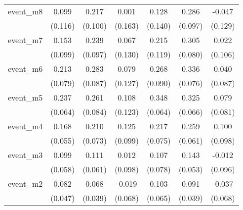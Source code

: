 {\begin{tabular}{l*{6}{c}}
event\_m8    &       0.099         &       0.217\sym{*}  &       0.001         &       0.128         &       0.286\sym{**} &      -0.047         \\
            &     (0.116)         &     (0.100)         &     (0.163)         &     (0.140)         &     (0.097)         &     (0.129)         \\
[1em]
event\_m7    &       0.153         &       0.239\sym{*}  &       0.067         &       0.215         &       0.305\sym{***}&       0.022         \\
            &     (0.099)         &     (0.097)         &     (0.130)         &     (0.119)         &     (0.080)         &     (0.106)         \\
[1em]
event\_m6    &       0.213\sym{**} &       0.283\sym{**} &       0.079         &       0.268\sym{**} &       0.336\sym{***}&       0.040         \\
            &     (0.079)         &     (0.087)         &     (0.127)         &     (0.090)         &     (0.076)         &     (0.087)         \\
[1em]
event\_m5    &       0.237\sym{***}&       0.261\sym{**} &       0.108         &       0.348\sym{***}&       0.325\sym{***}&       0.079         \\
            &     (0.064)         &     (0.084)         &     (0.123)         &     (0.064)         &     (0.066)         &     (0.081)         \\
[1em]
event\_m4    &       0.168\sym{**} &       0.210\sym{**} &       0.125         &       0.217\sym{**} &       0.259\sym{***}&       0.100         \\
            &     (0.055)         &     (0.073)         &     (0.099)         &     (0.075)         &     (0.061)         &     (0.098)         \\
[1em]
event\_m3    &       0.099         &       0.111         &       0.012         &       0.107         &       0.143\sym{**} &      -0.012         \\
            &     (0.058)         &     (0.061)         &     (0.098)         &     (0.078)         &     (0.053)         &     (0.096)         \\
[1em]
event\_m2    &       0.082         &       0.068         &      -0.019         &       0.103         &       0.091\sym{*}  &      -0.037         \\
            &     (0.047)         &     (0.039)         &     (0.068)         &     (0.065)         &     (0.039)         &     (0.068)         \\

\end{tabular}}
